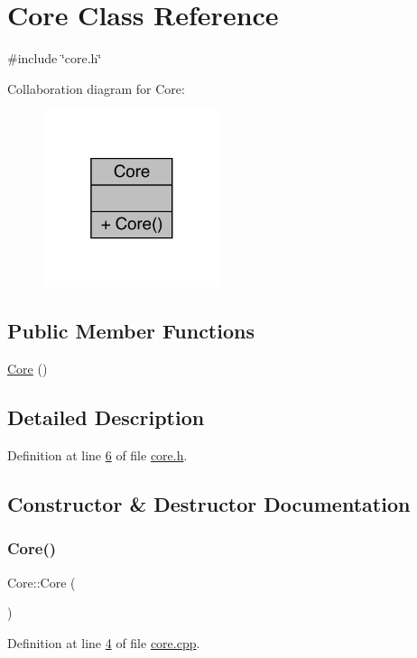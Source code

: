 \hypertarget{a00145}{}\section{Core Class Reference}
\label{a00145}


{\ttfamily \#include \char`\"{}core.\+h\char`\"{}}



Collaboration diagram for Core\+:
\nopagebreak
\begin{figure}[H]
\begin{center}
\leavevmode
\includegraphics[width=148pt]{d7/dce/a00143}
\end{center}
\end{figure}
\subsection*{Public Member Functions}
\begin{DoxyCompactItemize}
\item 
\hyperlink{a00145_a14e63188e0aa7c4a6f72d5501384d1f9}{Core} ()
\end{DoxyCompactItemize}


\subsection{Detailed Description}


Definition at line \hyperlink{a00014_source_l00006}{6} of file \hyperlink{a00014_source}{core.\+h}.



\subsection{Constructor \& Destructor Documentation}
\mbox{\label{a00145_a14e63188e0aa7c4a6f72d5501384d1f9}} 
\subsubsection{\texorpdfstring{Core()}{Core()}}
{\footnotesize\ttfamily Core\+::\+Core (\begin{DoxyParamCaption}{ }\end{DoxyParamCaption})}



Definition at line \hyperlink{a00011_source_l00004}{4} of file \hyperlink{a00011_source}{core.\+cpp}.

